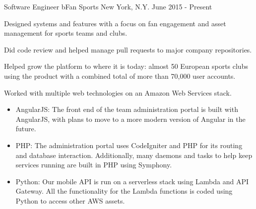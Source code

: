 

\begin{cventries}

  \cventry
    {Software Engineer} %
    {bFan Sports} %
    {New York, N.Y.} %
    {June 2015 - Present} %
    {
      \begin{cvitems} %
        \item {Designed systems and features with a focus on fan engagement and asset management for sports teams and clubs.}
        \item {Did code review and helped manage pull requests to major company repositories.}
        \item {Helped grow the platform to where it is today: almost 50 European sports clubs using the product with a combined total of more than 70,000 user accounts.}
        \item {Worked with multiple web technologies on an Amazon Web Services stack.}
        \begin{itemize}
          \item {AngularJS: The front end of the team administration portal is built with AngularJS, with plans to move to a more modern version of Angular in the future.}
          \item {PHP: The administration portal uses CodeIgniter and PHP for its routing and database interaction. Additionally, many daemons and tasks to help keep services running are built in PHP using Symphony.}
          \item {Python: Our mobile API is run on a serverless stack using Lambda and API Gateway. All the functionality for the Lambda functions is coded using Python to access other AWS assets.}
        \end{itemize}
      \end{cvitems}
    }


\end{cventries}
